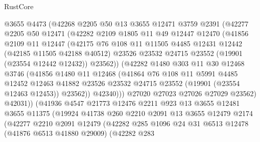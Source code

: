 \begin{lexlean}{RustCore}
\begin{coremodule}
            @3655
            @4473
            (@42268
              @2205
              @50
              @13
              @3655
              @12471
              @3759
              @2391
              (@42277
                @2205
                @50
                @12471
                (@42282
                  @2109
                  @1805
                  @11
                  @49
                  @12447
                  @12470
                  (@41856
                    @2109
                    @11
                    @12447
                    (@42175
                      @76
                      @108
                      @11
                      @11505
                      @4485
                      @12431
                      @12442
                      (@42185 @11505 @42188 @40512)
                      @23526
                      @23532
                      @24715
                      @23552
                      (@19901 (@23554 @12442 @12432))
                      @23562))
                  (@42282
                    @1480
                    @303
                    @11
                    @30
                    @12468
                    @3746
                    (@41856
                      @1480
                      @11
                      @12468
                      (@41864
                        @76
                        @108
                        @11
                        @5991
                        @4485
                        @12452
                        @12463
                        @41882
                        @23526
                        @23532
                        @24715
                        @23552
                        (@19901 (@23554 @12463 @12453))
                        @23562))
                    @42340)))
              @27020
              @27023
              @27026
              @27029
              @23562)
            @42031))
        (@41936
          @4547
          @21773
          @12476
          @2211
          @923
          @13
          @3655
          @12481
          @3655
          @11375
          (@19924
            @41738
            @260
            @2210
            @2091
            @13
            @3655
            @12479
            @2174
            (@42277
              @2210
              @2091
              @12479
              (@42282
                @285
                @1096
                @24
                @31
                @6513
                @12478
                (@41876 @6513 @41880 @29009)
                (@42282
                  @283

\end{coremodule}
\end{lexlean}
